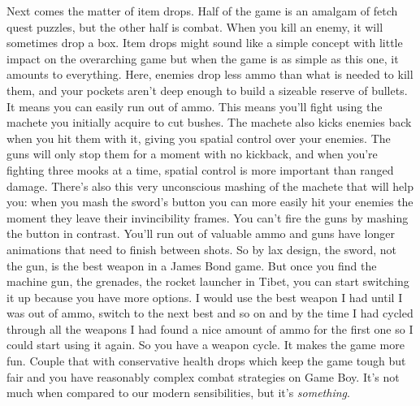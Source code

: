 \documentclass{book}
\let\oldcenter\center
\let\oldendcenter\endcenter
\renewenvironment{center}{\setlength\topsep{0pt}\oldcenter}{\oldendcenter}
\begin{document}
\begin{center}
\vspace{8pt}
\quad\vspace{4pt}
\end{center}

Next comes the matter of item drops. Half of the game is an amalgam of fetch quest puzzles, but the other half is combat. When you kill an enemy, it will sometimes drop a box. Item drops might sound like a simple concept with little impact on the overarching game but when the game is as simple as this one, it amounts to everything. Here, enemies drop less ammo than what is needed to kill them, and your pockets aren’t deep enough to build a sizeable reserve of bullets. It means you can easily run out of ammo. This means you’ll fight using the machete you initially acquire to cut bushes. The machete also kicks enemies back when you hit them with it, giving you spatial control over your enemies. The guns will only stop them for a moment with no kickback, and when you’re fighting three mooks at a time, spatial control is more important than ranged damage. There’s also this very unconscious mashing of the machete that will help you: when you mash the sword’s button you can more easily hit your enemies the moment they leave their invincibility frames. You can’t fire the guns by mashing the button in contrast. You’ll run out of valuable ammo and guns have longer animations that need to finish between shots. So by lax design, the sword, not the gun, is the best weapon in a James Bond game. But once you find the machine gun, the grenades, the rocket launcher in Tibet, you can start switching it up because you have more options. I would use the best weapon I had until I was out of ammo, switch to the next best and so on and by the time I had cycled through all the weapons I had found a nice amount of ammo for the first one so I could start using it again. So you have a weapon cycle. It makes the game more fun. Couple that with conservative health drops which keep the game tough but fair and you have reasonably complex combat strategies on Game Boy. It’s not much when compared to our modern sensibilities, but it’s \emph{something}.
\end{document}
